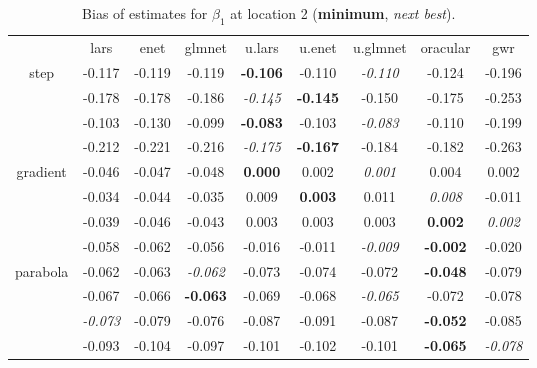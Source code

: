 \documentclass[authoryear, review, 11pt]{elsarticle}
\begin{document}
\begin{table}[ht]
\begin{center}
\begin{tabular}{ccccccccc}
  & lars & enet & glmnet & u.lars & u.enet & u.glmnet & oracular & gwr \\ 
  \cline{2-9}
  \multirow{4}{*}{step} & -0.117 & -0.119 & -0.119 & \textbf{-0.106} & -0.110 & \emph{-0.110} & -0.124 & -0.196 \\ 
  & -0.178 & -0.178 & -0.186 & \emph{-0.145} & \textbf{-0.145} & -0.150 & -0.175 & -0.253 \\ 
  & -0.103 & -0.130 & -0.099 & \textbf{-0.083} & -0.103 & \emph{-0.083} & -0.110 & -0.199 \\ 
  & -0.212 & -0.221 & -0.216 & \emph{-0.175} & \textbf{-0.167} & -0.184 & -0.182 & -0.263 \\ 
  \cline{2-9}
  \multirow{4}{*}{gradient} & -0.046 & -0.047 & -0.048 & \textbf{0.000} & 0.002 & \emph{0.001} & 0.004 & 0.002 \\ 
  & -0.034 & -0.044 & -0.035 & 0.009 & \textbf{0.003} & 0.011 & \emph{0.008} & -0.011 \\ 
  & -0.039 & -0.046 & -0.043 & 0.003 & 0.003 & 0.003 & \textbf{0.002} & \emph{0.002} \\ 
  & -0.058 & -0.062 & -0.056 & -0.016 & -0.011 & \emph{-0.009} & \textbf{-0.002} & -0.020 \\ 
  \cline{2-9}
  \multirow{4}{*}{parabola} & -0.062 & -0.063 & \emph{-0.062} & -0.073 & -0.074 & -0.072 & \textbf{-0.048} & -0.079 \\ 
  & -0.067 & -0.066 & \textbf{-0.063} & -0.069 & -0.068 & \emph{-0.065} & -0.072 & -0.078 \\ 
  & \emph{-0.073} & -0.079 & -0.076 & -0.087 & -0.091 & -0.087 & \textbf{-0.052} & -0.085 \\ 
  & -0.093 & -0.104 & -0.097 & -0.101 & -0.102 & -0.101 & \textbf{-0.065} & \emph{-0.078} \\ 
  \end{tabular}
\caption{Bias of estimates for $\beta_1$ at location 2 (\textbf{minimum}, \emph{next best}).\label{table:loc2-X1-BiasX}}
\end{center}
\end{table}
\end{document}
